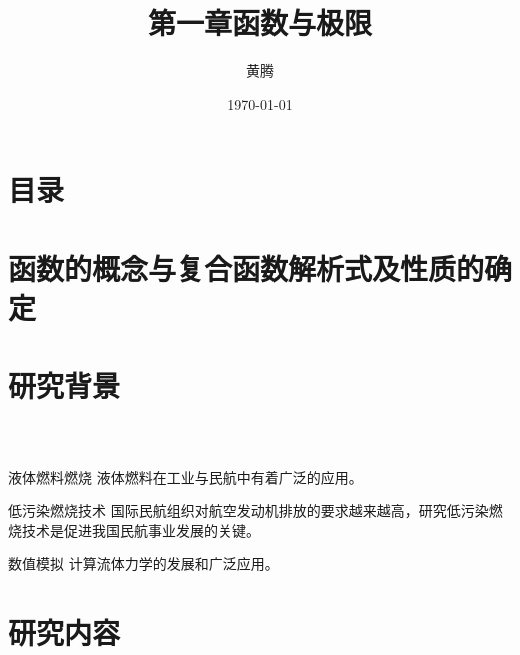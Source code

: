 \documentclass[compress,8pt,t]{beamer}
\title{第一章\quad 函数与极限}
\author{黄腾}
\institute[北京科技大学 学业中心]{北京科技大学\\ 学生学习与发展指导中心}
\date{\today}
\begin{document}
\maketitle

\section*{目录}
\begin{frame}
  \frametitle{\secname}
  \tableofcontents
\end{frame}

\section{函数的概念与复合函数解析式及性质的确定}
\begin{frame}[t]{\secname}
\end{frame}

\section{研究背景}

\begin{frame}
  \frametitle{\secname~ }
  \begin{block}{液体燃料燃烧}
    液体燃料在工业与民航中有着广泛的应用。
  \end{block}
  \begin{block}{低污染燃烧技术}
    国际民航组织对航空发动机排放的要求越来越高，研究低污染燃烧技术是促进我国民航事业发展的关键。
  \end{block}
  \begin{block}{数值模拟}
    计算流体力学的发展和广泛应用。
  \end{block}
\end{frame}
\section{研究内容}
\end{document}
